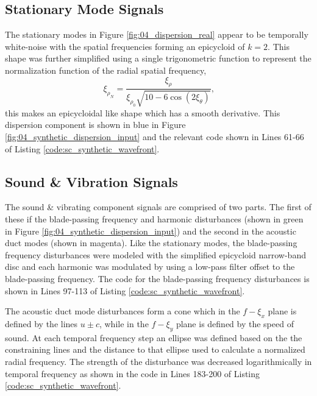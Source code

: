 \subsection{Stationary Mode Signals}
The stationary modes in Figure \ref{fig:04_dispersion_real} appear to be temporally white-noise with the spatial frequencies forming an epicycloid of $k=2$.
This shape was further simplified using a single trigonometric function to represent the normalization function of the radial spatial frequency,
\begin{equation}
  \xi_{\rho_N} = \frac{\xi_\rho}{\xi_{\rho_0}\sqrt{10-6\cos{(2\xi_\theta)}}} \textrm{,}
\end{equation}
this makes an epicycloidal like shape which has a smooth derivative.
This dispersion component is shown in blue in Figure \ref{fig:04_synthetic_dispersion_input} and the relevant code shown in Lines 61-66 of Listing \ref{code:sc_synthetic_wavefront}.
% 

\subsection{Sound \& Vibration Signals}
The sound \& vibrating component signals are comprised of two parts.
The first of these if the blade-passing frequency and harmonic disturbances (shown in green in Figure \ref{fig:04_synthetic_dispersion_input}) and the second in the acoustic duct modes (shown in magenta).
Like the stationary modes, the blade-passing frequency disturbances were modeled with the simplified epicycloid narrow-band disc and each harmonic was modulated by using a low-pass filter offset to the blade-passing frequency.
The code for the blade-passing frequency disturbances is shown in Lines 97-113 of Listing \ref{code:sc_synthetic_wavefront}.
% 

The acoustic duct mode disturbances form a cone which in the $f-\xi_x$ plane is defined by the lines $u\pm c$, while in the $f-\xi_y$ plane is defined by the speed of sound.
At each temporal frequency step an ellipse was defined based on the the constraining lines and the distance to that ellipse used to calculate a normalized radial frequency.
The strength of the disturbance was decreased logarithmically in temporal frequency as shown in the code in Lines 183-200 of Listing \ref{code:sc_synthetic_wavefront}.
% 

